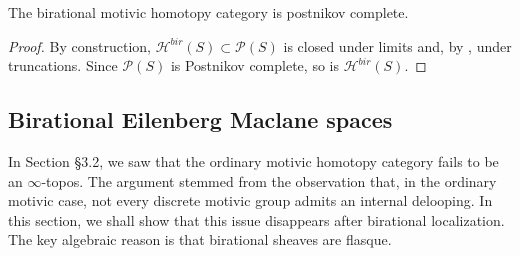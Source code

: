 \begin{thm}\label{post comp Hbir}
    The birational motivic homotopy category is postnikov complete.
\end{thm}
\begin{proof}
   By construction, $\mathcal{H}^{bir}(S)\subset \mathcal{P}(S)$ is closed under limits and, by , under truncations. Since $\mathcal{P}(S)$ is Postnikov complete, so is $\mathcal{H}^{bir}(S)$. 
\end{proof}

\subsection{Birational Eilenberg Maclane spaces}
In Section \S3.2, we saw that the ordinary motivic homotopy category fails to be an $\infty$-topos. The argument stemmed from the observation that, in the ordinary motivic case, not every discrete motivic group admits an internal delooping. In this section, we shall show that this issue disappears after birational localization. The key algebraic reason is that birational sheaves are flasque. 


